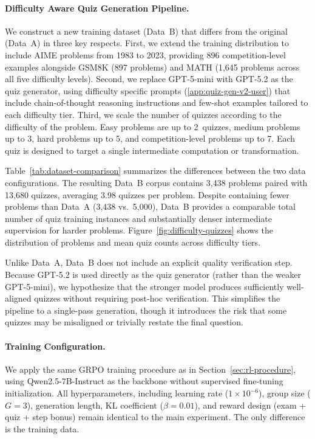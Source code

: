 \documentclass[12pt]{report}
\begin{document}
\paragraph{Difficulty Aware Quiz Generation Pipeline.}
We construct a new training dataset (Data~B) that differs from the original (Data~A) in three key respects. First, we extend the training distribution to include AIME problems from 1983 to 2023, providing 896 competition-level examples alongside GSM8K (897 problems) and MATH (1{,}645 problems across all five difficulty levels). Second, we replace GPT-5-mini with GPT-5.2 as the quiz generator, using difficulty specific prompts (\ref{app:quiz-gen-v2-user}) that include chain-of-thought reasoning instructions and few-shot examples tailored to each difficulty tier. Third, we scale the number of quizzes according to the difficulty of the problem. Easy problems are up to 2~quizzes, medium problems up to 3, hard problems up to 5, and competition-level problems up to 7. Each quiz is designed to target a single intermediate computation or transformation.

Table~\ref{tab:dataset-comparison} summarizes the differences between the two data configurations. The resulting Data~B corpus contains 3{,}438 problems paired with 13{,}680 quizzes, averaging 3.98 quizzes per problem. Despite containing fewer problems than Data~A (3{,}438 vs.\ 5{,}000), Data~B provides a comparable total number of quiz training instances and substantially denser intermediate supervision for harder problems. Figure~\ref{fig:difficulty-quizzes} shows the distribution of problems and mean quiz counts across difficulty tiers.

Unlike Data~A, Data~B does not include an explicit quality verification step. Because GPT-5.2 is used directly as the quiz generator (rather than the weaker GPT-5-mini), we hypothesize that the stronger model produces sufficiently well-aligned quizzes without requiring post-hoc verification. This simplifies the pipeline to a single-pass generation, though it introduces the risk that some quizzes may be misaligned or trivially restate the final question.

\paragraph{Training Configuration.}
We apply the same GRPO training procedure as in Section~\ref{sec:rl-procedure}, using Qwen2.5-7B-Instruct as the backbone without supervised fine-tuning initialization. All hyperparameters, including learning rate ($1 \times 10^{-6}$), group size ($G = 3$), generation length, KL coefficient ($\beta = 0.01$), and reward design (exam + quiz + step bonus) remain identical to the main experiment. The only difference is the training data.
\end{document}
